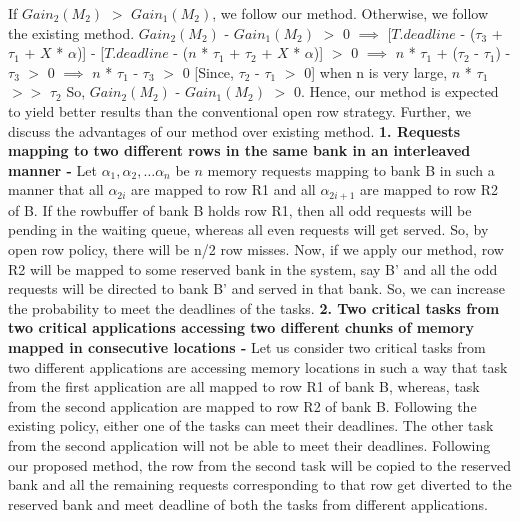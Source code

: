 If $Gain_{2}(M_{2})$ $>$ $Gain_{1}(M_{2})$, we follow our method. Otherwise, we follow the existing method. 
\newline
\newline
$Gain_{2}(M_{2})$ - $Gain_{1}(M_{2})$ $>$ 0
\newline 
\newline
$\implies$ [$T.deadline$ - ($\tau_{3}$ + $\tau_{1}$ + $X$ * $\alpha$)] - [$T.deadline$ - ($n$ * $\tau_{1}$ + $\tau_{2}$ + $X$ * $\alpha$)] $>$ 0
\newline
\newline
$\implies$ $n$ * $\tau_{1}$ + ($\tau_{2}$ - $\tau_{1}$) - $\tau_{3}$ $>$ 0
\newline
\newline
$\implies$ $n$ * $\tau_{1}$ - $\tau_{3}$ $>$ 0 [Since, $\tau_{2}$ - $\tau_{1}$ $>$ 0]
\newline
\newline
when n is very large, $n$ * $\tau_{1}$ $>>$ $\tau_{2}$
\newline
\newline
So, $Gain_{2}(M_{2})$ - $Gain_{1}(M_{2})$ $>$ 0. 
\newline
Hence, our method is expected to yield better results than the conventional open row strategy. 
Further, we discuss the advantages of our method over existing method. 
\newline
\newline
 {\bf 1. Requests mapping to two different rows in the same bank in an interleaved manner - } 
 \newline
 \newline
 Let $\alpha_{1}, \alpha_{2}, \dots \alpha_{n}$ be $n$ memory requests mapping to bank B in such a manner that all 
 $\alpha_{2i}$ are mapped to row R1 and all $\alpha_{2i + 1}$ are mapped to row R2 of B. If the rowbuffer of bank B holds 
 row R1, then all odd requests will be pending in the waiting queue, whereas all even requests will get served. So, by open 
 row policy, there will be n/2 row misses. Now, if we apply our method, row R2 will be mapped to some reserved bank in the 
 system, say B' and all the odd requests will be directed to bank B' and served in that bank. So, we can increase the 
 probability to meet the deadlines of the tasks.
 \newline
 \newline
 {\bf 2. Two critical tasks from two critical applications accessing two different chunks of memory mapped in consecutive 
 locations - }
 \newline
 \newline
 Let us consider two critical tasks from two different applications are accessing memory locations in such a way that task
 from the first application are all mapped to row R1 of bank B, whereas, task from the second application are mapped to 
 row R2 of bank B. Following the existing policy, either one of the tasks can meet their deadlines. The other task from the 
 second application will not be able to meet their deadlines. Following our proposed method, the row from the second task
 will be copied to the reserved bank and all the remaining requests corresponding to that row get diverted to the reserved 
 bank and meet deadline of both the tasks from different applications.
 

